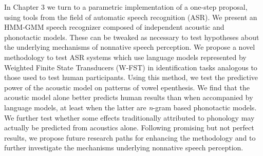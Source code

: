 In Chapter 3 we turn to a parametric implementation of a one-step proposal, using tools from the field of automatic speech recognition (ASR). We present an HMM-GMM speech recognizer composed of independent acoustic and phonotactic models. These can be tweaked as necessary to test hypotheses about the underlying mechanisms of nonnative speech perception. We propose a novel methodology to test ASR systems which use language models represented by Weighted Finite State Transducers (W-FST) in identification tasks analogous to those used to test human participants. Using this method, we test the predictive power of the acoustic model on patterns of vowel epenthesis. We find that the acoustic model alone better predicts human results than when accompanied by language models, at least when the latter are \textit{n}-gram based phonotactic models. We further test whether some effects traditionally attributed to phonology may actually be predicted from acoustics alone. Following promising but not perfect results, we propose future research paths for enhancing the methodology and to further investigate the mechanisms underlying nonnative speech perception.  